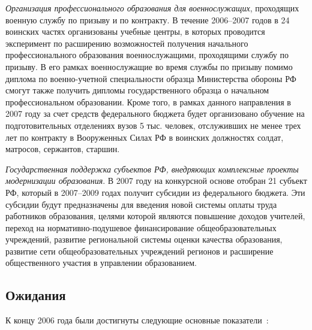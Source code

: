 \documentclass[article, 12pt, russian, oneside]{ncc}
\begin{document}
\emph{Организация профессионального образования для военнослужащих},\linebreak
проходящих военную службу по призыву и по контракту. В течение
2006--2007 годов в 24 воинских частях организованы учебные центры, в
которых проводится эксперимент по расширению возможностей получения
начального профессионального образования военнослужащими, проходящими
службу по призыву. В его рамках военнослужащие во время службы по
призыву помимо диплома по военно-учетной специальности образца
Министерства обороны РФ смогут также получить дипломы государственного
образца о начальном профессиональном образовании. Кроме того, в рамках
данного направления в 2007 году за счет средств федерального бюджета
будет организовано обучение на подготовительных отделениях вузов 5
тыс. человек, отслуживших не менее трех лет по контракту в Вооруженных
Силах РФ в воинских должностях солдат, матросов, сержантов, старшин.

\emph{Государственная поддержка субъектов РФ, внедряющих комплексные
  проекты модернизации образования}. В 2007 году на конкурсной основе
отобран 21 субъект РФ, который в 2007--2009 годах получит субсидии из
федерального бюджета. Эти субсидии будут предназначены для введения
новой системы оплаты труда работников образования, целями которой
являются повышение доходов учителей, переход на нормативно-подушевое
финансирование общеобразовательных учреждений, развитие региональной
системы оценки качества образования, развитие сети общеобразовательных
учреждений регионов и расширение общественного участия в управлении
образованием.

\subsection{Ожидания}

К концу 2006 года были достигнуты следующие основные
показатели~\cite{Edu_Waitings}:
\end{document}
